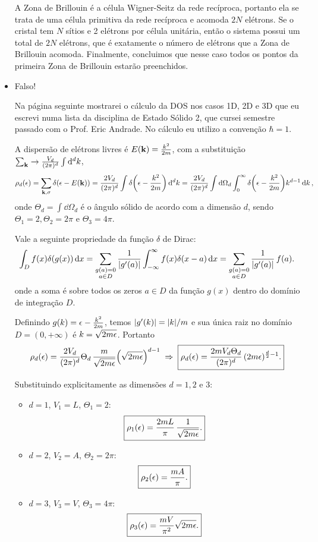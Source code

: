 \documentclass[a4paper,10pt]{article}
\begin{document}
\begin{itemize}
A Zona de Brillouin é a célula Wigner-Seitz da rede recíproca, portanto ela se trata de uma célula primitiva da rede recíproca e acomoda $2 N$ elétrons. Se o cristal tem $N$ sítios e 2 elétrons por célula unitária, então o sistema possui um total de $2N$ elétrons, que é exatamente o número de elétrons que a Zona de Brillouin acomoda. Finalmente, concluimos que nesse caso todos os pontos da primeira Zona de Brillouin estarão preenchidos.

\item Falso!

Na página seguinte mostrarei o cálculo da DOS nos casos 1D, 2D e 3D que eu escrevi numa lista da disciplina de Estado Sólido 2, que cursei semestre passado com o Prof. Eric Andrade. No cálculo eu utilizo a convenção $\hbar = 1$.

\pagebreak

A dispersão de elétrons livres é $E({\vb{k}}) = \frac{k^2}{2m}$, com a substituição $\sum_{{\vb{k}}} \to \frac{V_d}{(2\pi)^d} \int \dd[d]{k}$,
$$
\rho_d(\epsilon) = \sum_{{\vb{k}}, \sigma} \delta(\epsilon - E({\vb{k}})) =
\frac{2V_d}{(2\pi)^d} \int \delta\qty(\epsilon - \frac{k^2}{2m}) \dd[d]{k} =
\frac{2V_d}{(2\pi)^d} \int \dd{\Omega_d} \int_0^\infty \delta\qty(\epsilon - \frac{k^2}{2m}) k^{d-1} \dd{k},
$$
onde $\Theta_d = \int \dd{\Omega_d}$ é o ângulo sólido de acordo com a dimensão $d$, sendo $\Theta_1 = 2, \Theta_2 = 2\pi$ e $\Theta_3 = 4\pi$.

Vale a seguinte propriedade da função $\delta$ de Dirac:
$$
\int_{D} f(x) \delta(g(x)) \dd{x} =
\sum_{\substack{g(a)=0 \\ a \in D}} \frac{1}{\abs{g'(a)}} \int_{-\infty}^{\infty} f(x) \delta(x-a) \dd{x}=
\sum_{\substack{g(a)=0 \\ a \in D}} \frac{1}{\abs{g'(a)}} \, f(a).
$$
onde a soma é sobre todos os zeros $a \in D$ da função $g(x)$ dentro do domínio de integração $D$.

Definindo $g(k) = \epsilon - \frac{k^2}{2m}$, temos $\abs{g'(k)} = \abs{k} / m$ e sua única raiz no domínio $D = (0, +\infty)$ é $k = \sqrt{2m \epsilon}$. Portanto
$$
\rho_d(\epsilon) = \frac{2V_d}{(2\pi)^d} \Theta_d \, \frac{m}{\sqrt{2m\epsilon}}
\qty(\sqrt{2m \epsilon})^{d-1} \; \Rightarrow \;
\boxed{ \rho_d(\epsilon) = \frac{2 m V_d \Theta_d}{(2\pi)^d} \, (2m\epsilon)^{\frac{d}{2}-1}. }
$$

Substituindo explicitamente as dimensões $d = 1, 2$ e $3$:
\begin{itemize}
\item $d = 1$, $V_1 = L$, $\Theta_1 = 2$:
$$
\boxed{\rho_1(\epsilon) = \frac{2 m L}{\pi} \, \frac{1}{\sqrt{2m\epsilon}}.}
$$
\item $d = 2$, $V_2 = A$, $\Theta_2 = 2\pi$:
$$
\boxed{\rho_2(\epsilon) = \frac{m A}{\pi}.}
$$
\item $d = 3$, $V_3 = V$, $\Theta_3 = 4\pi$:
$$
\boxed{\rho_3(\epsilon) = \frac{m V}{\pi^2} \sqrt{2m\epsilon}.}
$$
\end{itemize}


\end{itemize}
\end{document}
